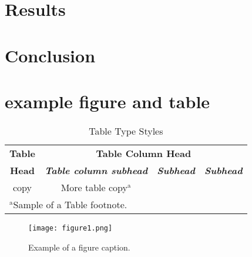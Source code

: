 \documentclass[conference,a4paper]{IEEEtran}
\begin{document}
\section{Results}\label{sec: five}

\section{Conclusion}\label{sec: six}




\section{example figure and table}
\begin{table}[htbp]
\caption{Table Type Styles}
\begin{center}
\begin{tabular}{|c|c|c|c|}
\hline
\textbf{Table}&\multicolumn{3}{|c|}{\textbf{Table Column Head}} \\
\cline{2-4} 
\textbf{Head} & \textbf{\textit{Table column subhead}}& \textbf{\textit{Subhead}}& \textbf{\textit{Subhead}} \\
\hline
copy& More table copy$^{\mathrm{a}}$& &  \\
\hline
\multicolumn{4}{l}{$^{\mathrm{a}}$Sample of a Table footnote.}
\end{tabular}
\label{tab1}
\end{center}
\end{table}

\begin{figure}[htbp]
\centerline{\texttt{[image: figure1.png]}}
\caption{Example of a figure caption.}
\label{fig}
\end{figure}




\end{document}
